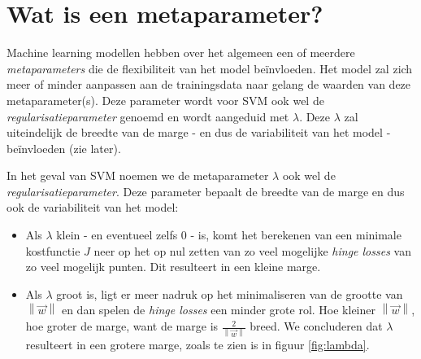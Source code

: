 \documentclass[twoside, kulak]{kulakreport}
\newcommand{\norm}[1]{\left\| #1 \right\|}
\begin{document}
	\section{Wat is een metaparameter?}
	
	Machine learning modellen hebben over het algemeen een of meerdere \textit{metaparameters} die de flexibiliteit van het model beïnvloeden. Het model zal zich meer of minder aanpassen aan de trainingsdata naar gelang de waarden van deze metaparameter(s). Deze parameter wordt voor SVM ook wel de \textit{regularisatieparameter} genoemd en wordt aangeduid met \(\lambda\). Deze \(\lambda\) zal uiteindelijk de breedte van de marge - en dus de variabiliteit van het model - beïnvloeden (zie later). 
	
	In het geval van SVM noemen we de metaparameter \(\lambda\) ook wel de \textit{regularisatieparameter}. Deze parameter bepaalt de breedte van de marge en dus ook de variabiliteit van het model:
	
	\begin{itemize}
		
		\item Als \(\lambda\) klein - en eventueel zelfs \(0\) - is, komt het berekenen van een minimale kostfunctie $J$ neer op het op nul zetten van zo veel mogelijke \textit{hinge losses} van zo veel mogelijk punten. Dit resulteert in een kleine marge. 
		
		\item Als \(\lambda\) groot is, ligt er meer nadruk op het minimaliseren van de grootte van \(\norm{\vec{w}}\) en dan spelen de \textit{hinge losses} een minder grote rol. Hoe kleiner \(\norm{\vec{w}}\), hoe groter de marge, want de marge is \(\frac{2}{\norm{\vec{w}}}\) breed. We concluderen dat \(\lambda\) resulteert in een grotere marge, zoals te zien is in figuur \ref{fig:lambda}.
		
	\end{itemize}
	
\end{document}

